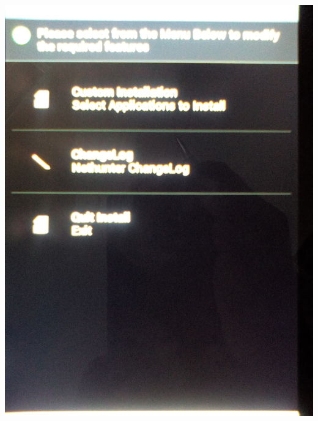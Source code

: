 \documentclass[11pt,a4paper]{article}
\begin{document}
\includegraphics[scale=0.09]{./Image/img15} \\ \\
\end{document}
